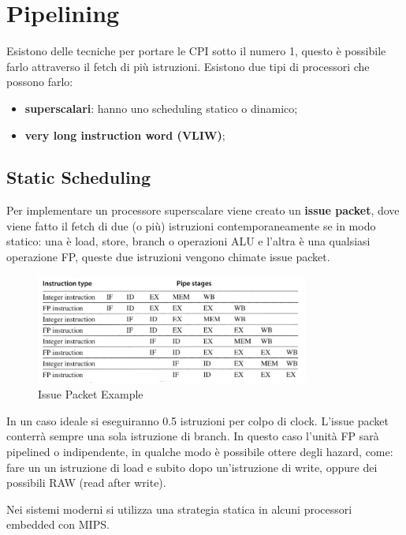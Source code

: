 \documentclass[12pt]{article}
\begin{document}
\newpage
\section{Pipelining}
Esistono delle tecniche per portare le CPI sotto il numero 1, questo \`e possibile farlo attraverso il fetch di pi\`u istruzioni. Esistono due tipi di processori che possono farlo:
\begin{itemize}
    \item \textbf{superscalari}: hanno uno scheduling statico o dinamico;
    \item \textbf{very long instruction word (VLIW)};
\end{itemize}


\subsection{Static Scheduling}
Per implementare un processore superscalare viene creato un \textbf{issue packet}, dove viene fatto il fetch di due (o pi\`u) istruzioni contemporaneamente se in modo statico: una \`e load, store, branch o operazioni ALU e l'altra \`e una qualsiasi operazione FP, queste due istruzioni vengono chimate issue packet.
\begin{figure}[H]
    \centering
    \includegraphics[width=0.8\textwidth]{issue-packet-example.png}
    \caption{Issue Packet Example}
    \label{fig:issue-packet-example}
\end{figure}
In un caso ideale si eseguiranno 0.5 istruzioni per colpo di clock. L'issue packet conterr\`a sempre una sola istruzione di branch. In questo caso l'unit\`a FP sar\`a pipelined o indipendente, in qualche modo \`e possibile ottere degli hazard, come: fare un un istruzione di load e subito dopo un'istruzione di write, oppure dei possibili RAW (read after write).

Nei sistemi moderni si utilizza una strategia statica in alcuni processori embedded con MIPS.
\end{document}
